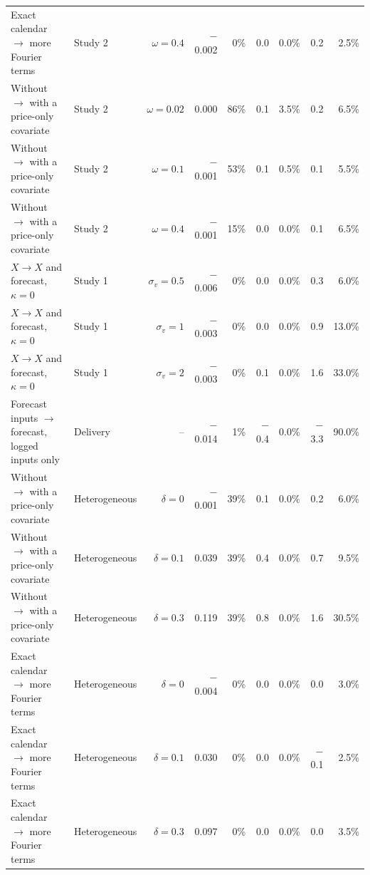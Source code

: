 \begin{tabular}{llrrrrrrr}
Exact calendar $\to$ more Fourier terms & Study 2 & $\omega = 0.4$ & $-$0.002 & 0\% & 0.0 & 0.0\% & 0.2 & 2.5\% \\
Without $\to$ with a price-only covariate & Study 2 & $\omega = 0.02$ & 0.000 & 86\% & 0.1 & 3.5\% & 0.2 & 6.5\% \\
Without $\to$ with a price-only covariate & Study 2 & $\omega = 0.1$ & $-$0.001 & 53\% & 0.1 & 0.5\% & 0.1 & 5.5\% \\
Without $\to$ with a price-only covariate & Study 2 & $\omega = 0.4$ & $-$0.001 & 15\% & 0.0 & 0.0\% & 0.1 & 6.5\% \\
$X \to X$ and forecast, $\kappa = 0$ & Study 1 & $\sigma_v = 0.5$ & $-$0.006 & 0\% & 0.0 & 0.0\% & 0.3 & 6.0\% \\
$X \to X$ and forecast, $\kappa = 0$ & Study 1 & $\sigma_v = 1$ & $-$0.003 & 0\% & 0.0 & 0.0\% & 0.9 & 13.0\% \\
$X \to X$ and forecast, $\kappa = 0$ & Study 1 & $\sigma_v = 2$ & $-$0.003 & 0\% & 0.1 & 0.0\% & 1.6 & 33.0\% \\
Forecast inputs $\to$ forecast, logged inputs only & Delivery & -- & $-$0.014 & 1\% & $-$0.4 & 0.0\% & $-$3.3 & 90.0\% \\
Without $\to$ with a price-only covariate & Heterogeneous & $\delta = 0$ & $-$0.001 & 39\% & 0.1 & 0.0\% & 0.2 & 6.0\% \\
Without $\to$ with a price-only covariate & Heterogeneous & $\delta = 0.1$ & 0.039 & 39\% & 0.4 & 0.0\% & 0.7 & 9.5\% \\
Without $\to$ with a price-only covariate & Heterogeneous & $\delta = 0.3$ & 0.119 & 39\% & 0.8 & 0.0\% & 1.6 & 30.5\% \\
Exact calendar $\to$ more Fourier terms & Heterogeneous & $\delta = 0$ & $-$0.004 & 0\% & 0.0 & 0.0\% & 0.0 & 3.0\% \\
Exact calendar $\to$ more Fourier terms & Heterogeneous & $\delta = 0.1$ & 0.030 & 0\% & 0.0 & 0.0\% & $-$0.1 & 2.5\% \\
Exact calendar $\to$ more Fourier terms & Heterogeneous & $\delta = 0.3$ & 0.097 & 0\% & 0.0 & 0.0\% & 0.0 & 3.5\% \\
\bottomrule
\end{tabular}
